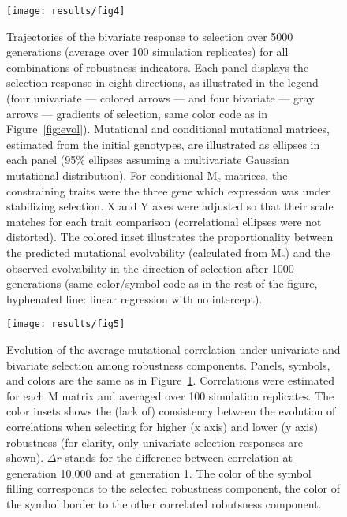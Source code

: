 \documentclass[10pt,a4paper]{article}
\newcommand{\M}{\bm{\mathrm M}}
\begin{document}
\begin{figure}[thp!]
\begin{adjustwidth}{-1in}{0in}
\begin{flushright}
\texttt{[image: results/fig4]}
\caption{\color{Gray} \label{fig:evolvability} Trajectories of the bivariate response to selection over 5000 generations (average over 100 simulation replicates) for all combinations of robustness indicators. Each panel displays the selection response in eight directions, as illustrated in the legend (four univariate --- colored arrows --- and four bivariate --- gray arrows --- gradients of selection, same color code as in Figure~\ref{fig:evol}). Mutational and conditional mutational matrices, estimated from the initial genotypes, are illustrated as ellipses in each panel (95\% ellipses assuming a multivariate Gaussian mutational distribution). For conditional $\bm{\mathrm M}_c$ matrices, the constraining traits were the three gene which expression was under stabilizing selection. X and Y axes were adjusted so that their scale matches for each trait comparison (correlational ellipses were not distorted). The colored inset illustrates the proportionality between the predicted mutational evolvability (calculated from $\bm{\mathrm M}_c$) and the observed evolvability in the direction of selection after 1000 generations (same color/symbol code as in the rest of the figure, hyphenated line: linear regression with no intercept). }
\end{flushright}\end{adjustwidth}
\end{figure}

\begin{figure}[thp!]
\begin{flushright}
\texttt{[image: results/fig5]}
\caption{\color{Gray} \label{fig:evolcor} Evolution of the average mutational correlation under univariate and bivariate selection among robustness components. Panels, symbols, and colors are the same as in Figure~\ref{fig:evolvability}. Correlations were estimated for each $\M$ matrix and averaged over 100 simulation replicates. The color insets shows the (lack of) consistency between the evolution of correlations when selecting for higher (x axis) and lower (y axis) robustness (for clarity, only univariate selection responses are shown). $\Delta r$ stands for the difference between correlation at generation 10,000 and at generation 1. The color of the symbol filling corresponds to the selected robustness component, the color of the symbol border to the other correlated robutsness component.}
\end{flushright}%
\end{figure}
\end{document}
